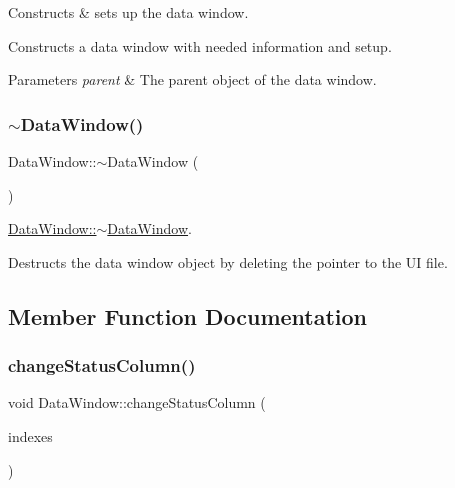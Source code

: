 Constructs \& sets up the data window. 

Constructs a data window with needed information and setup. 
\begin{DoxyParams}{Parameters}
{\em parent} & The parent object of the data window. \\
\hline
\end{DoxyParams}
\mbox{\label{class_data_window_a6e72c3705abc085d3d84cb182493cd6a}} 
\subsubsection{\texorpdfstring{$\sim$\+Data\+Window()}{~DataWindow()}}
{\footnotesize\ttfamily Data\+Window\+::$\sim$\+Data\+Window (\begin{DoxyParamCaption}{ }\end{DoxyParamCaption})}



\hyperlink{class_data_window_a6e72c3705abc085d3d84cb182493cd6a}{Data\+Window\+::$\sim$\+Data\+Window}. 

Destructs the data window object by deleting the pointer to the UI file. 

\subsection{Member Function Documentation}
\mbox{\label{class_data_window_ace296e3143e2ab4db036b53bf6b969db}} 
\subsubsection{\texorpdfstring{change\+Status\+Column()}{changeStatusColumn()}}
{\footnotesize\ttfamily void Data\+Window\+::change\+Status\+Column (\begin{DoxyParamCaption}\item[{Q\+Model\+Index\+List}]{indexes }\end{DoxyParamCaption})\hspace{0.3cm}{\ttfamily [private]}}



